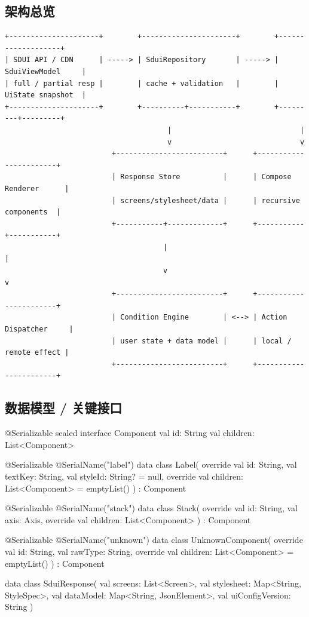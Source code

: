 \subsection{架构总览}

\begin{lstlisting}
+---------------------+        +----------------------+        +-------------------+
| SDUI API / CDN      | -----> | SduiRepository       | -----> | SduiViewModel     |
| full / partial resp |        | cache + validation   |        | UiState snapshot  |
+---------------------+        +----------+-----------+        +---------+---------+
                                      |                              |
                                      v                              v
                         +-------------------------+      +-----------------------+
                         | Response Store          |      | Compose Renderer      |
                         | screens/stylesheet/data |      | recursive components  |
                         +-----------+-------------+      +-----------+-----------+
                                     |                                |
                                     v                                v
                         +-------------------------+      +-----------------------+
                         | Condition Engine        | <--> | Action Dispatcher     |
                         | user state + data model |      | local / remote effect |
                         +-------------------------+      +-----------------------+
\end{lstlisting}

\subsection{数据模型 / 关键接口}

\begin{kotlin}
@Serializable
sealed interface Component {
    val id: String
    val children: List<Component>
}

@Serializable @SerialName("label")
data class Label(
    override val id: String,
    val textKey: String,
    val styleId: String? = null,
    override val children: List<Component> = emptyList()
) : Component

@Serializable @SerialName("stack")
data class Stack(
    override val id: String,
    val axis: Axis,
    override val children: List<Component>
) : Component

@Serializable @SerialName("unknown")
data class UnknownComponent(
    override val id: String,
    val rawType: String,
    override val children: List<Component> = emptyList()
) : Component

data class SduiResponse(
    val screens: List<Screen>,
    val stylesheet: Map<String, StyleSpec>,
    val dataModel: Map<String, JsonElement>,
    val uiConfigVersion: String
)
\end{kotlin}


